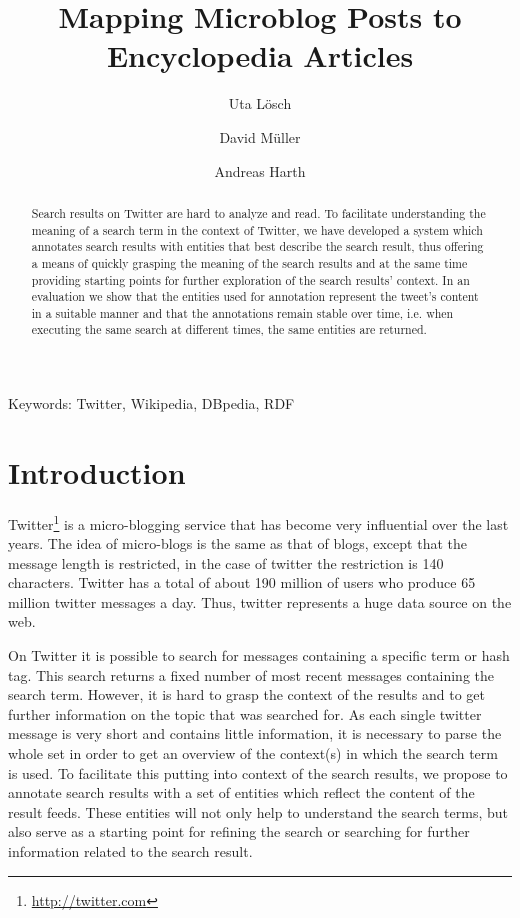 \documentclass{llncs}
\title{Mapping Microblog Posts to Encyclopedia Articles}
\author{Uta L\"{o}sch \and David M\"{u}ller \and Andreas Harth}
\institute{
	Karlsruhe Institute of Technology (KIT), D-76131 Karlsruhe, Germany\\ 
	\email{uta.loesch@kit.edu},\\
	\email{david.mueller@student.kit.edu},\\
	\email{harth@kit.edu}
}
\begin{document}
\maketitle

\begin{abstract}
Search results on Twitter are hard to analyze and read. To facilitate understanding the meaning of a search term in the context of Twitter, we have developed a system which annotates search results with entities that best describe the search result, thus offering a means of quickly grasping the meaning of the search results and at the same time providing starting points for further exploration of the search results' context. In an evaluation we show that the entities used for annotation represent the tweet's content in a suitable manner and that the annotations remain stable over time, i.e. when executing the same search at different times, the same entities are returned.
\end{abstract}

Keywords: Twitter, Wikipedia, DBpedia, RDF

\section{Introduction}

Twitter\footnote{\url{http://twitter.com}} is a micro-blogging service that has become very influential over the last years. The idea of micro-blogs is the same as that of blogs, except that the message length is restricted, in the case of twitter the restriction is 140 characters. Twitter has a total of about 190 million of users who produce 65 million twitter messages a day. Thus, twitter represents a huge data source on the web.

On Twitter it is possible to search for messages containing a specific term or hash tag. This search returns a fixed number of most recent messages containing the search term. However, it is hard to grasp the context of the results and to get further information on the topic that was searched for. As each single twitter message is very short and contains little information, it is necessary to parse the whole set in order to get an overview of the context(s) in which the search term is used. To facilitate this putting into context of the search results, we propose to annotate search results with a set of entities which reflect the content of the result feeds. These entities will not only help to understand the search terms, but also serve as a starting point for refining the search or searching for further information related to the search result. 
\end{document}
